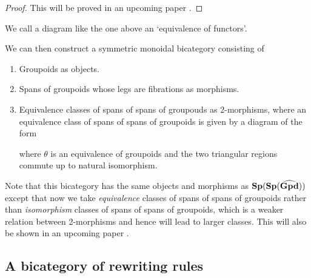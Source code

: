 \documentclass[11pt]{amsart}
\theoremstyle{remark}
\theoremstyle{definition}
\begin{document}
\begin{proof}
This will be proved in an upcoming paper \cite{CicCour}.
\end{proof}
We call a diagram like the one above an `equivalence of functors'.

We can then construct a symmetric monoidal bicategory consisting of
\begin{enumerate}
\item{Groupoids as objects.}
\item{Spans of groupoids whose legs are fibrations as morphisms.}
\item{Equivalence classes of spans of spans of groupouds as 2-morphisms, where an equivalence class of spans of spans of groupoids is given by a diagram of the form
\begin{center}
\end{center}
where $\theta$ is an equivalence of groupoids and the two triangular regions commute up to natural isomorphism.}
\end{enumerate}
Note that this bicategory has the same objects and morphisms as $\bold{Sp(Sp(\widehat{Gpd}))}$ except that now we take \emph{equivalence} classes of spans of spans of groupoids rather than \emph{isomorphism} classes of spans of spans of groupoids, which is a weaker relation between 2-morphisms and hence will lead to larger classes. This will also be shown in an upcoming paper \cite{CicCour}.

\subsection{A bicategory of rewriting rules} %
\label{subsec:Rewrite}
\end{document}
